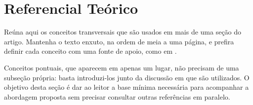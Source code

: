\section{Referencial Teórico}
\label{sec:referencial}

Reúna aqui os conceitos transversais que são usados em mais de uma seção do
artigo. Mantenha o texto enxuto, na ordem de meia a uma página, e prefira
definir cada conceito com uma fonte de apoio, como em \cite{exemplo2023conf}.

Conceitos pontuais, que aparecem em apenas um lugar, não precisam de uma
subseção própria: basta introduzi-los junto da discussão em que são utilizados.
O objetivo desta seção é dar ao leitor a base mínima necessária para acompanhar
a abordagem proposta sem precisar consultar outras referências em paralelo.
